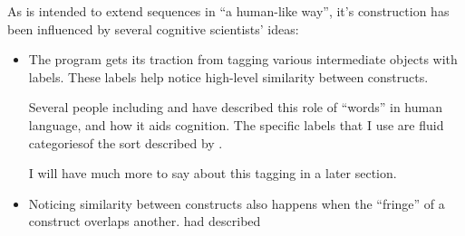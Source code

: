 \documentclass{article}
\begin{document}
As \seq is intended to extend sequences in ``a human-like way'', it's construction has been influenced by several cognitive scientists' ideas:

\begin{itemize}
\item The program gets its traction from tagging various intermediate objects with labels. These labels help \seq notice high-level similarity between constructs.

Several people including \dan and \andy have described this role of ``words'' in human language, and how it aids cognition. The specific labels that I use are fluid categoriesof the sort described by \hof.

I will have much more to say about this tagging in a later section.

\item Noticing similarity between constructs also happens when the ``fringe'' of a construct overlaps another. \cite{James} had described 
\end{itemize}



\printindex
\end{document}
